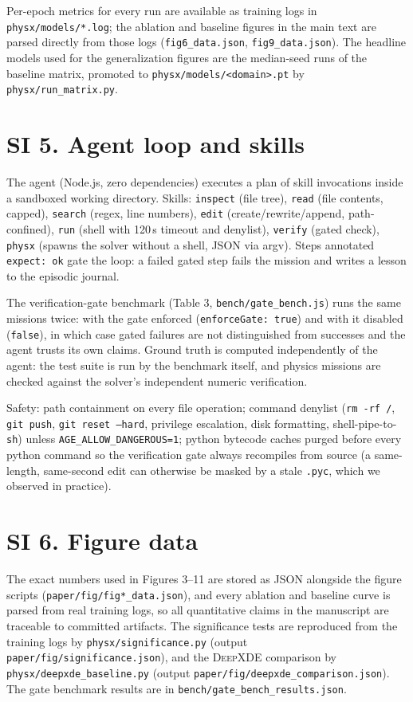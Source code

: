 \documentclass[11pt,a4paper]{article}
\begin{document}
Per-epoch metrics for every run are available as training logs in
\texttt{physx/models/*.log}; the ablation and baseline figures in the main
text are parsed directly from those logs (\texttt{fig6\_data.json},
\texttt{fig9\_data.json}). The headline models used for the generalization
figures are the median-seed runs of the baseline matrix, promoted to
\texttt{physx/models/<domain>.pt} by \texttt{physx/run\_matrix.py}.

\section*{SI 5. Agent loop and skills}

The agent (Node.js, zero dependencies) executes a plan of skill invocations
inside a sandboxed working directory. Skills: \texttt{inspect} (file tree),
\texttt{read} (file contents, capped), \texttt{search} (regex, line
numbers), \texttt{edit} (create/rewrite/append, path-confined),
\texttt{run} (shell with 120\,s timeout and denylist), \texttt{verify}
(gated check), \texttt{physx} (spawns the solver without a shell, JSON via
argv). Steps annotated \texttt{expect: ok} gate the loop: a failed gated
step fails the mission and writes a lesson to the episodic journal.

The verification-gate benchmark (Table 3, \texttt{bench/gate\_bench.js})
runs the same missions twice: with the gate enforced (\texttt{enforceGate:
true}) and with it disabled (\texttt{false}), in which case gated failures
are not distinguished from successes and the agent trusts its own claims.
Ground truth is computed independently of the agent: the test suite is run
by the benchmark itself, and physics missions are checked against the
solver's independent numeric verification.

Safety: path containment on every file operation; command denylist
(\texttt{rm -rf /}, \texttt{git push}, \texttt{git reset --hard},
privilege escalation, disk formatting, shell-pipe-to-\texttt{sh}) unless
\texttt{AGE\_ALLOW\_DANGEROUS=1}; python bytecode caches purged before every
python command so the verification gate always recompiles from source (a
same-length, same-second edit can otherwise be masked by a stale
\texttt{.pyc}, which we observed in practice).

\section*{SI 6. Figure data}

The exact numbers used in Figures 3--11 are stored as JSON alongside the
figure scripts (\texttt{paper/fig/fig*\_data.json}), and every ablation and
baseline curve is parsed from real training logs, so all quantitative
claims in the manuscript are traceable to committed artifacts. The
significance tests are reproduced from the training logs by
\texttt{physx/significance.py} (output \texttt{paper/fig/significance.json}),
and the \textsc{DeepXDE} comparison by
\texttt{physx/deepxde\_baseline.py} (output
\texttt{paper/fig/deepxde\_comparison.json}). The gate
benchmark results are in \texttt{bench/gate\_bench\_results.json}.
\end{document}

